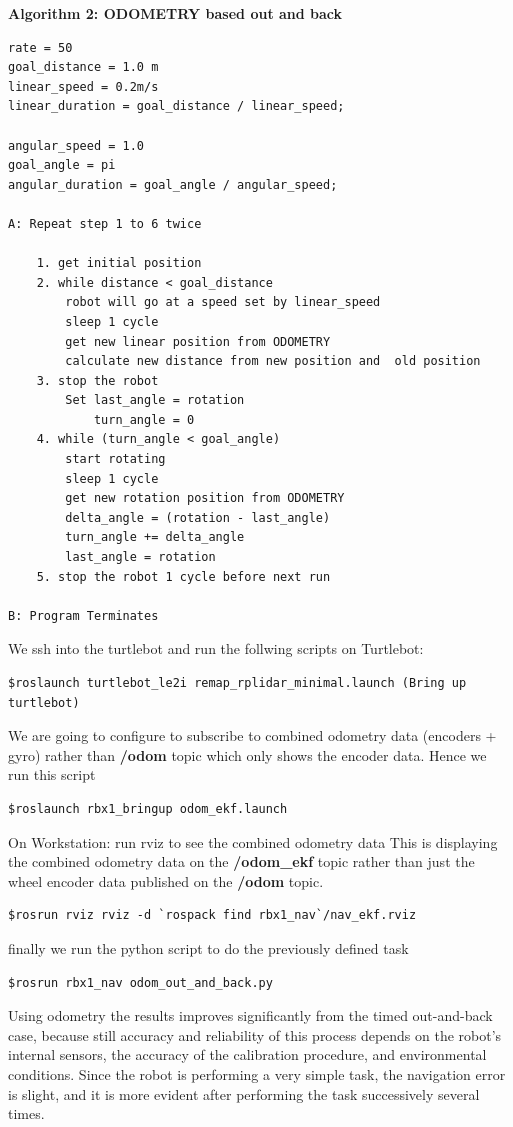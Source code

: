 \documentclass[10pt,a4paper]{article}
\begin{document}
\textbf{Algorithm 2: ODOMETRY based out and back}
\begin{lstlisting}[frame=single]
rate = 50
goal_distance = 1.0 m
linear_speed = 0.2m/s
linear_duration = goal_distance / linear_speed;

angular_speed = 1.0
goal_angle = pi
angular_duration = goal_angle / angular_speed;

A: Repeat step 1 to 6 twice

	1. get initial position
	2. while distance < goal_distance
		robot will go at a speed set by linear_speed
		sleep 1 cycle
		get new linear position from ODOMETRY
		calculate new distance from new position and  old position
	3. stop the robot
		Set last_angle = rotation
			turn_angle = 0
	4. while (turn_angle < goal_angle)
		start rotating
		sleep 1 cycle
		get new rotation position from ODOMETRY
		delta_angle = (rotation - last_angle)
		turn_angle += delta_angle
		last_angle = rotation	
	5. stop the robot 1 cycle before next run
	
B: Program Terminates
\end{lstlisting}


We ssh into the turtlebot and run the follwing scripts
on Turtlebot:
\begin{lstlisting}[frame=single] 
$roslaunch turtlebot_le2i remap_rplidar_minimal.launch (Bring up turtlebot)
\end{lstlisting}
We are going to configure to subscribe to combined odometry data (encoders + gyro) 
rather than \textbf{/odom }topic which only shows the encoder data. Hence we run this script
\begin{lstlisting}[frame=single] 
$roslaunch rbx1_bringup odom_ekf.launch
\end{lstlisting}

On Workstation:
run rviz to see the combined odometry data
This is displaying the combined odometry data on the \textbf{/odom\_ekf} 
topic rather than just the wheel encoder data published on the \textbf{/odom} topic.
\begin{lstlisting}[frame=single] 
$rosrun rviz rviz -d `rospack find rbx1_nav`/nav_ekf.rviz
\end{lstlisting}

finally we run the python script to do the previously defined task 
\begin{lstlisting}[frame=single] 
$rosrun rbx1_nav odom_out_and_back.py
\end{lstlisting}

Using odometry the results improves significantly from the timed out-and-back case, because still accuracy and reliability of this process depends on the robot's internal sensors, the accuracy of the calibration procedure, and environmental conditions.
Since the robot is performing a very simple task, the navigation error is slight, and it is more evident after performing the task successively several times.
\end{document}
